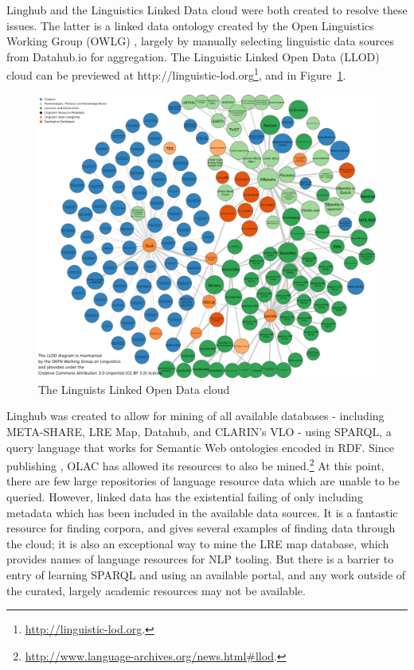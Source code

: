Linghub and the Linguistics Linked Data cloud were both created to resolve these issues. The latter is a linked data ontology created by the Open Linguistics Working Group (OWLG) \citep{chiarcos2011working, chiarcos2012open, chiarcos2013building, mccrae2016open}, largely by manually selecting linguistic data sources from Datahub.io for aggregation. The Linguistic Linked Open Data (LLOD) cloud \citep{chiarcos2012linking} can be previewed at http://linguistic-lod.org\footnote{\href{http://linguistic-lod.org/}{http://linguistic-lod.org}. }, and in Figure~\ref{fig:llod}.

\begin{figure}
 \centering
 \includegraphics[width=1\textwidth]{img/llod.png}
 \caption{The Linguists Linked Open Data cloud \citep{chiarcos2012linking}}
 \label{fig:llod}
\end{figure}

Linghub \citep{mccrae2015linghub, mccrae2015reconciling} was created to allow for mining of all available databases - including META-SHARE, LRE Map, Datahub, and CLARIN's VLO - using SPARQL, a query language that works for Semantic Web ontologies encoded in RDF. Since publishing \citet{mccrae2015linghub}, OLAC has allowed its resources to also be mined.\footnote{\href{http://www.language-archives.org/news.html\#llod}{http://www.language-archives.org/news.html\#llod}. } At this point, there are few large repositories of language resource data which are unable to be queried. However, linked data has the existential failing of only including metadata which has been included in the available data sources. It is a fantastic resource for finding corpora, and \citet{mccrae2015linghub} gives several examples of finding data through the cloud;  it is also an exceptional way to mine the LRE map database, which provides names of language resources for NLP tooling. But there is a barrier to entry of learning SPARQL and using an available portal, and any work outside of the curated, largely academic resources may not be available.

